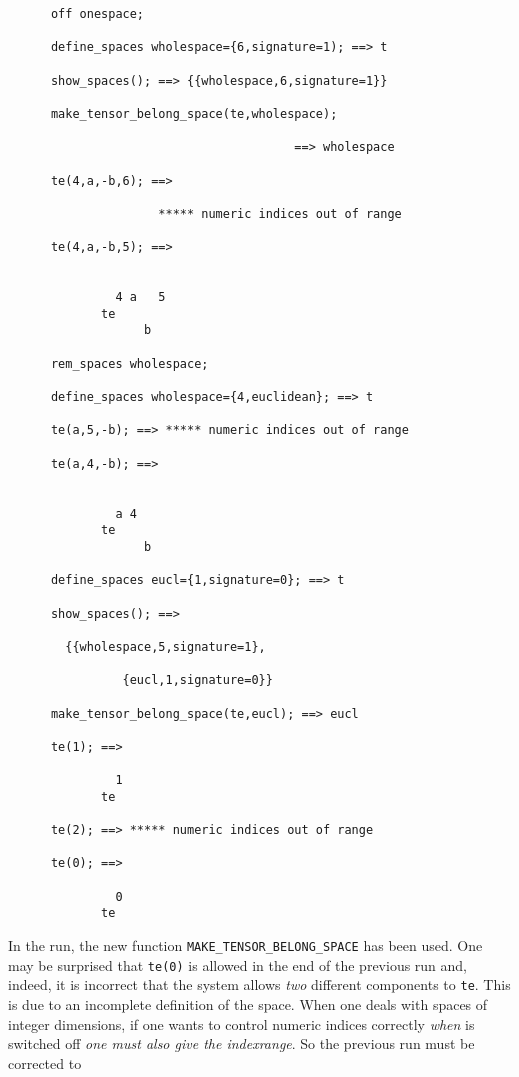 \begin{verbatim}
      off onespace;

      define_spaces wholespace={6,signature=1); ==> t

      show_spaces(); ==> {{wholespace,6,signature=1}}

      make_tensor_belong_space(te,wholespace);

                                        ==> wholespace

      te(4,a,-b,6); ==>

                     ***** numeric indices out of range

      te(4,a,-b,5); ==>


               4 a   5
             te
                   b

      rem_spaces wholespace;

      define_spaces wholespace={4,euclidean}; ==> t

      te(a,5,-b); ==> ***** numeric indices out of range

      te(a,4,-b); ==>


               a 4
             te
                   b

      define_spaces eucl={1,signature=0}; ==> t

      show_spaces(); ==>

        {{wholespace,5,signature=1},

                {eucl,1,signature=0}}

      make_tensor_belong_space(te,eucl); ==> eucl

      te(1); ==>

               1
             te

      te(2); ==> ***** numeric indices out of range

      te(0); ==>

               0
             te
\end{verbatim} 
In the run, the new function 
\texttt{MAKE\_TENSOR\_BELONG\_SPACE}
has been used.
One may be surprised that \texttt{te(0)} is allowed in the end of
the previous run and, indeed,
it is incorrect that the system allows \emph{two} different components to
\texttt{te}.
This is due to an incomplete definition of the space. When one deals
with spaces of integer dimensions, if one wants to control numeric indices
correctly \emph{when}  is switched off \emph{one must also give the
indexrange}.
So the previous run must be corrected to
